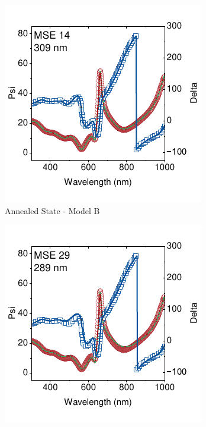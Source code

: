 \begin{figure}[htbp]

    \begin{subfigure}[t]{0.45\textwidth}
        \centering
        \includegraphics[width=\textwidth]{chapters/ellipsometry/image/t23_fitted_thickness.pdf} %
        \caption{Annealed State - Model B}
        \label{fig:ellipsometry:static_fits:t23_fitted_thick}
    \end{subfigure}
    \hfill
    \begin{subfigure}[t]{0.45\textwidth}
        \centering
        \includegraphics[width=\textwidth]{chapters/ellipsometry/image/t23_fixed_thickness_50_v.pdf} %

\end{subfigure}
\end{figure}
